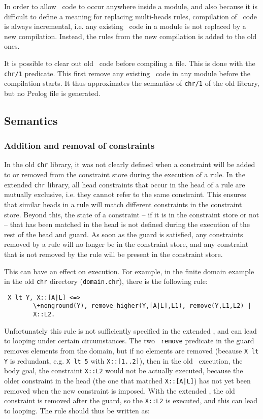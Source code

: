 In order to allow \chr\  code to occur anywhere inside a module, and also 
because it is difficult to define a meaning for replacing multi-heads rules,
compilation of \chr\  code is always incremental, i.e. any existing \chr\ 
code in a module is not replaced by a new compilation. Instead, the rules
from the new compilation is added to the old ones. 

It is possible to clear out old \chr\  code before compiling a file. This is done
with the {\tt chr/1} predicate. This first remove any existing \chr\  code in
any module before the compilation starts. It thus approximates the semantics
of {\tt chr/1} of the old library, but no Prolog file is generated.

\subsection{Semantics}

\subsubsection{Addition and removal of constraints}

In the old {\tt chr} library, it was not clearly defined when a constraint
will be added to or removed from the constraint store during the execution of 
a rule.
In the extended {\tt chr} library, all head constraints
that occur in the head of a rule are mutually exclusive, i.e. they cannot
refer to the same constraint. This ensures that similar heads in a rule
will match different constraints in the constraint store.
Beyond this, the state of a constraint -- if it 
is in the constraint store or not -- that has been matched in the head 
is not defined during the execution of the rest of the head and guard.
As soon as the guard is satisfied, any constraints removed by a rule will
no longer be in the constraint store, and any constraint that is not
removed by the rule will be present in the constraint store.

This can have an effect on execution. For example, in the finite domain
example in the old {\tt chr} directory ({\tt domain.chr}), there is the following rule:

\begin{verbatim}
 X lt Y, X::[A|L] <=> 
        \+nonground(Y), remove_higher(Y,[A|L],L1), remove(Y,L1,L2) |
        X::L2.
\end{verbatim}

Unfortunately this rule is not sufficiently specified in the extended
\chr, and can lead to looping under certain circumstances. The two {\tt
remove} predicate in the guard removes elements from the domain, but if no
elements are removed (because \verb+X lt Y+ is redundant, e.g. \verb+X lt 5+ with
\verb+X::[1..2]+), then in the old \chr\ execution, the body goal, the constraint
\verb+X::L2+ would not be actually executed, because the older constraint in
the head (the one that matched \verb+X::[A|L]+) has not yet been removed when
the new constraint is imposed. With the extended \chr, the old constraint
is removed after the guard, so the \verb+X::L2+ is executed, and this can
lead to looping. The rule should thus be written as:

